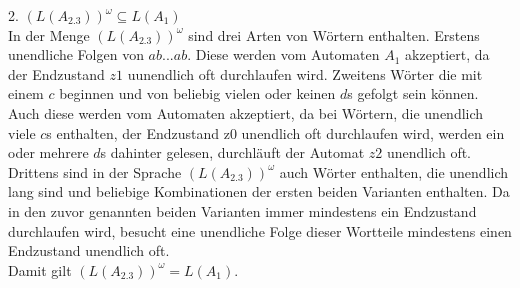 \documentclass[12pt, paper=a4]{article}
\begin{document}
2. $(L(A_{2.3}))^\omega \subseteq L(A_1)$\\
In der Menge $(L(A_{2.3}))^\omega$ sind drei Arten von Wörtern enthalten. Erstens unendliche Folgen von $ab...ab$. Diese werden vom Automaten $A_1$ akzeptiert, da der Endzustand $z1$ uunendlich oft durchlaufen wird. Zweitens Wörter die mit einem $c$ beginnen und von beliebig vielen oder keinen $d$s gefolgt sein können. Auch diese werden vom Automaten akzeptiert, da bei Wörtern, die unendlich viele $c$s enthalten, der Endzustand z0 unendlich oft durchlaufen wird, werden ein oder mehrere $d$s dahinter gelesen, durchläuft der Automat $z2$ unendlich oft. Drittens sind in der Sprache $(L(A_{2.3}))^\omega$ auch Wörter enthalten, die unendlich lang sind und beliebige Kombinationen der ersten beiden Varianten enthalten. Da in den zuvor genannten beiden Varianten immer mindestens ein Endzustand durchlaufen wird, besucht eine unendliche Folge dieser Wortteile mindestens einen Endzustand unendlich oft.\\

Damit gilt $(L(A_{2.3}))^\omega = L(A_1)$.
\end{document}
